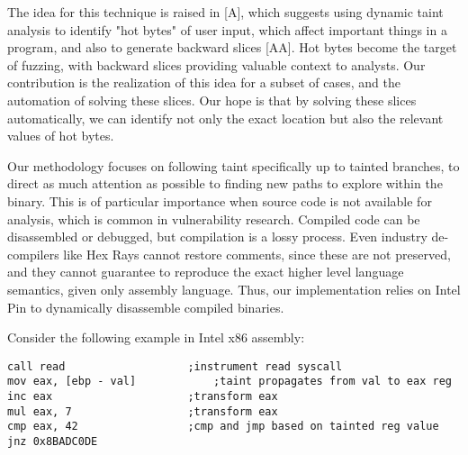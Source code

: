 \documentclass[11pt,expanded,copyright]{fsuthesis}
\begin{document}
The idea for this technique is raised in [A], which suggests using dynamic taint analysis to identify "hot bytes" of user input, which affect important things in a program, and also to generate backward slices [AA]. Hot bytes become the target of fuzzing, with backward slices providing valuable context to analysts. Our contribution is the realization of this idea for a subset of cases, and the automation of solving these slices. Our hope is that by solving these slices automatically, we can identify not only the exact location but also the relevant values of hot bytes. 

Our methodology focuses on following taint specifically up to tainted branches, to direct as much attention as possible to finding new paths to explore within the binary. This is of particular importance when source code is not available for analysis, which is common in vulnerability research. Compiled code can be disassembled or debugged, but compilation is a lossy process. Even industry de-compilers like Hex Rays cannot restore comments, since these are not preserved, and they cannot guarantee to reproduce the exact higher level language semantics, given only assembly language. Thus, our implementation relies on Intel Pin to dynamically disassemble compiled binaries.

Consider the following example in Intel x86 assembly:

\begin{lstlisting}[style=asmstyle]
call read					;instrument read syscall
mov eax, [ebp - val]	        ;taint propagates from val to eax reg
inc eax						;transform eax
mul eax, 7					;transform eax
cmp eax, 42					;cmp and jmp based on tainted reg value
jnz 0x8BADC0DE
\end{lstlisting}
\end{document}
